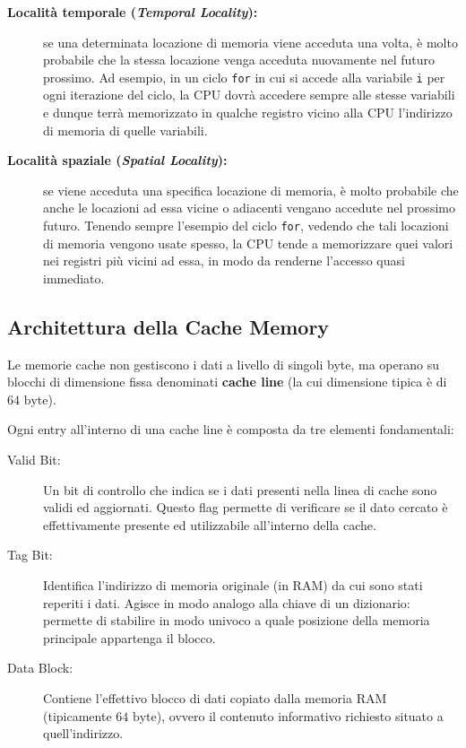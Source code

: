 \documentclass[12pt]{report}
\begin{document}
	\begin{description}
		\item [\textbf{Località temporale (\textit{Temporal Locality}):}] se una determinata locazione di memoria viene acceduta una volta, è molto probabile che la stessa locazione venga acceduta nuovamente nel futuro prossimo. Ad esempio, in un ciclo \texttt{for} in cui si accede alla variabile \texttt{i} per ogni iterazione del ciclo, la CPU dovrà accedere sempre alle stesse variabili e dunque terrà memorizzato in qualche registro vicino alla CPU l'indirizzo di memoria di quelle variabili.
		
		\item [\textbf{Località spaziale (\textit{Spatial Locality}):}] se viene acceduta una specifica locazione di memoria, è molto probabile che anche le locazioni ad essa vicine o adiacenti vengano accedute nel prossimo futuro. Tenendo sempre l'esempio del ciclo \texttt{for}, vedendo che tali locazioni di memoria vengono usate spesso, la CPU tende a memorizzare quei valori nei registri più vicini ad essa, in modo da renderne l'accesso quasi immediato.
	\end{description}
	
	\subsection{Architettura della Cache Memory}
	
	Le memorie cache non gestiscono i dati a livello di singoli byte, ma operano su blocchi di dimensione fissa denominati \textbf{cache line} (la cui dimensione tipica è di $64\text{ byte}$).
	
	Ogni entry all'interno di una cache line è composta da tre elementi fondamentali:
	\begin{description}
		\item[Valid Bit:] Un bit di controllo che indica se i dati presenti nella linea di cache sono validi ed aggiornati. Questo flag permette di verificare se il dato cercato è effettivamente presente ed utilizzabile all'interno della cache.
		\item[Tag Bit:] Identifica l'indirizzo di memoria originale (in RAM) da cui sono stati reperiti i dati. Agisce in modo analogo alla chiave di un dizionario: permette di stabilire in modo univoco a quale posizione della memoria principale appartenga il blocco.
		\item[Data Block:] Contiene l'effettivo blocco di dati copiato dalla memoria RAM (tipicamente $64\text{ byte}$), ovvero il contenuto informativo richiesto situato a quell'indirizzo.
	\end{description}
	
\end{document}
